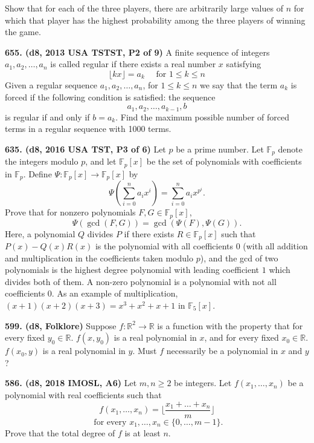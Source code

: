 \documentclass{article}
\begin{document}
Show that for each of the three players, there are arbitrarily large values of $n$ for which that player has the highest probability among the three players of winning the game.

\textbf{655. (\color{red}d8\color{black}, 2013 USA TSTST, P2 of 9)} A finite sequence of integers $a_{1}, a_{2}, \ldots, a_{n}$ is called regular if there exists a real number $x$ satisfying
$$\lfloor k x\rfloor=a_{k} \quad \text { for } 1 \leq k \leq n$$
Given a regular sequence $a_{1}, a_{2}, \ldots, a_{n}$, for $1 \leq k \leq n$ we say that the term $a_{k}$ is forced if the following condition is satisfied:
the sequence
$$a_{1}, a_{2}, \ldots, a_{k-1}, b$$
is regular if and only if $b=a_{k}$. Find the maximum possible number of forced terms in a regular sequence with 1000 terms.

\textbf{635. (\color{red}d8\color{black}, 2016 USA TST, P3 of 6)} Let $p$ be a prime number. Let $\mathbb F_p$ denote the integers modulo $p$, and let $\mathbb F_p[x]$ be the set of polynomials with coefficients in $\mathbb F_p$. Define $\Psi : \mathbb F_p[x] \to \mathbb F_p[x]$ by\[ \Psi( \sum_{i=0}^n a_i x^i ) = \sum_{i=0}^n a_i x^{p^i}. \]Prove that for nonzero polynomials $F,G \in \mathbb F_p[x]$,\[ \Psi(\gcd(F,G)) = \gcd(\Psi(F), \Psi(G)). \]Here, a polynomial $Q$ divides $P$ if there exists $R \in \mathbb F_p[x]$ such that $P(x) - Q(x) R(x)$ is the polynomial with all coefficients $0$ (with all addition and multiplication in the coefficients taken modulo $p$), and the gcd of two polynomials is the highest degree polynomial with leading coefficient $1$ which divides both of them. A non-zero polynomial is a polynomial with not all coefficients $0$. As an example of multiplication, $(x+1)(x+2)(x+3) = x^3+x^2+x+1$ in $\mathbb F_5[x]$.

\textbf{599. (\color{red}d8\color{black}, Folklore)} Suppose $f:\mathbb{R}^2 \to \mathbb{R}$ is a function with the property that for every fixed $y_0 \in \mathbb{R}$. $f(x, y_0)$ is a real polynomial in $x$, and for every fixed $x_0 \in \mathbb{R}$. $f(x_0, y)$ is a real polynomial in $y$. Must $f$ necessarily be a polynomial in $x$ and $y$?

\textbf{586. (\color{red}d8\color{black}, 2018 IMOSL, A6)} Let $m, n \geq 2$ be integers. Let $f(x_1,\dots, x_n)$ be a polynomial with real coefficients such that $$f(x_1,\dots, x_n)=\lfloor \frac{x_1+\dots + x_n}{m} \rfloor$$ $$\text{ for every } x_1,\dots, x_n\in \{0,\dots, m-1\}.$$ Prove that the total degree of $f$ is at least $n.$
\end{document}
